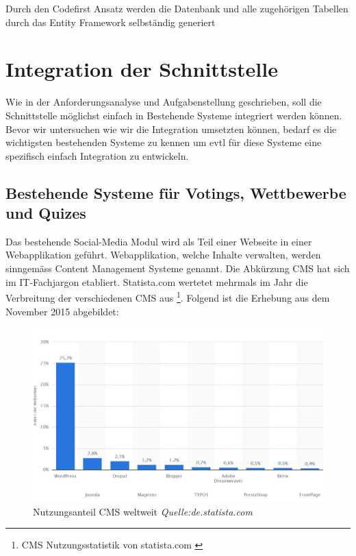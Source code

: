 Durch den Codefirst Ansatz werden die Datenbank und alle zugehörigen
Tabellen durch das Entity Framework selbständig generiert

\newpage

\section{Integration der
Schnittstelle}\label{integration-der-schnittstelle}

Wie in der Anforderungsanalyse und Aufgabenstellung geschrieben, soll
die Schnittstelle möglichst einfach in Bestehende Systeme integriert
werden können. Bevor wir untersuchen wie wir die Integration umsetzten
können, bedarf es die wichtigsten bestehenden Systeme zu kennen um evtl
für diese Systeme eine spezifisch einfach Integration zu entwickeln.

\subsection{Bestehende Systeme für Votings, Wettbewerbe und
Quizes}\label{bestehende-systeme-fuxfcr-votings-wettbewerbe-und-quizes}

Das bestehende Social-Media Modul wird als Teil einer Webseite in einer
Webapplikation geführt. Webapplikation, welche Inhalte verwalten, werden
sinngemäss Content Management Systeme genannt. Die Abkürzung CMS hat
sich im IT-Fachjargon etabliert. Statista.com wertetet mehrmals im Jahr
die Verbreitung der verschiedenen CMS aus \footnote{CMS
  Nutzungsstatistik von statista.com \autocite{statisticinfostatista}}.
Folgend ist die Erhebung aus dem November 2015 abgebildet:

\begin{figure}[htbp]
\centering
\includegraphics{images/cms_statistik_november2015.JPG}
\caption{Nutzungsanteil CMS weltweit \emph{Quelle:de.statista.com}}
\end{figure}


